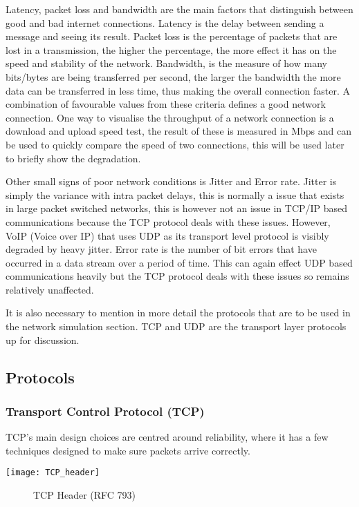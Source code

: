 Latency, packet loss and bandwidth are the main factors that distinguish between good and bad internet connections. Latency is the delay between sending a message and seeing its result. Packet loss is the percentage of packets that are lost in a transmission, the higher the percentage, the more effect it has on the speed and stability of the network. Bandwidth, is the measure of how many bits/bytes are being transferred per second, the larger the bandwidth the more data can be transferred in less time, thus making the overall connection faster. A combination of favourable values from these criteria defines a good network connection. One way to visualise the throughput of a network connection is a download and upload speed test, the result of these is measured in Mbps and can be used to quickly compare the speed of two connections, this will be used later to briefly show the degradation.

Other small signs of poor network conditions is Jitter and Error rate. Jitter is simply the variance with intra packet delays, this is normally a issue that exists in large packet switched networks, this is however not an issue in TCP/IP based communications because the TCP protocol deals with these issues. However, VoIP (Voice over IP) that uses UDP as its transport level protocol is visibly degraded by heavy jitter. Error rate is the number of bit errors that have occurred in a data stream over a period of time. This can again effect UDP based communications heavily but the TCP protocol deals with these issues so remains relatively unaffected.

It is also necessary to mention in more detail the protocols that are to be used in the network simulation section. TCP \citep{TCP} and UDP \citep{UDP} are the transport layer protocols up for discussion. 

\subsection{Protocols}
\subsubsection{Transport Control Protocol (TCP)}
TCP's main design choices are centred around reliability, where it has a few techniques designed to make sure packets arrive correctly. 

\begin{center}
	\texttt{[image: TCP\_header]}
	\begin{figure}[h]
		\caption{TCP Header (RFC 793)}
	\end{figure}	
	
\end{center}

